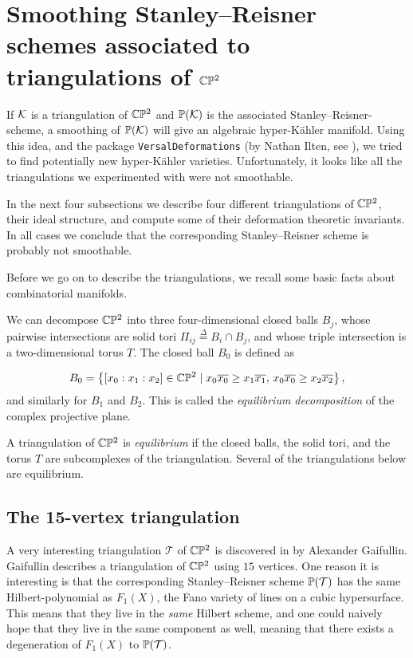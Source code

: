 \section{Smoothing Stanley--Reisner schemes associated to triangulations of $\C \P^2$}

If $\K$ is a triangulation of $\C \P^2$ and $\P(\K)$ is the associated Stanley--Reisner-scheme, a smoothing of $\P(\K)$ will give an algebraic hyper-Kähler manifold. Using this idea, and the \MM package \texttt{VersalDeformations} (by Nathan Ilten, see \cite{ilten_versaldeformations}), we tried to find potentially new hyper-Kähler varieties. Unfortunately, it looks like all the triangulations we experimented with were not smoothable.

In the next four subsections we describe four different triangulations of $\C \P^2$, their ideal structure, and compute some of their deformation theoretic invariants. In all cases we conclude that the corresponding Stanley--Reisner scheme is probably not smoothable.

Before we go on to describe the triangulations, we recall some basic facts about combinatorial manifolds.

We can decompose $\C \P^2$ into three four-dimensional closed balls $B_j$, whose pairwise intersections are solid tori $\Pi_{ij} \stackrel{\Delta}= B_i \cap B_j$, and whose triple intersection is a two-dimensional torus $T$. The closed ball $B_0$ is defined as 

$$
B_0 = \left\{ [x_0:x_1:x_2] \in \C \P ^2 \mid x_0\overline{x_0} \geq x_1 \overline{x_1}, \,  x_0\overline{x_0} \geq x_2\overline{x_2} \right\},
$$
and similarly for $B_1$ and $B_2$. This is called the \emph{equilibrium decomposition} of the complex projective plane.

A triangulation of $\C \P^2$ is \emph{equilibrium} if the closed balls, the solid tori, and the torus $T$ are subcomplexes of the triangulation. Several of the triangulations below are equilibrium.

\subsection{The 15-vertex triangulation}

A very interesting triangulation $\mathcal T$ of $\C\P^2$ is discovered in \cite{cp2_15_chess} by Alexander Gaifullin. Gaifullin describes a triangulation of $\C \P^2$ using $15$ vertices. One reason it is interesting is that the corresponding Stanley--Reisner scheme $\P(\mathcal T)$ has the same Hilbert-polynomial as $F_1(X)$, the Fano variety of lines on a cubic hypersurface. This means that they live in the \emph{same} Hilbert scheme, and one could naively hope that they live in the same component as well, meaning that there exists a degeneration of $F_1(X)$ to $\P(\mathcal T)$.

